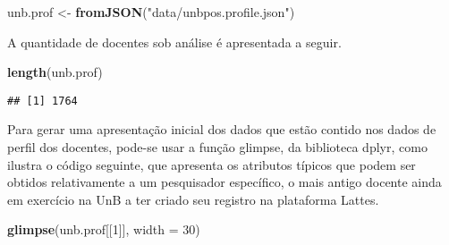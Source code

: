 \documentclass[]{article}
\newenvironment{Shaded}{\begin{snugshade}}{\end{snugshade}}
\newcommand{\KeywordTok}[1]{\textcolor[rgb]{0.13,0.29,0.53}{\textbf{#1}}}
\newcommand{\DataTypeTok}[1]{\textcolor[rgb]{0.13,0.29,0.53}{#1}}
\newcommand{\DecValTok}[1]{\textcolor[rgb]{0.00,0.00,0.81}{#1}}
\newcommand{\StringTok}[1]{\textcolor[rgb]{0.31,0.60,0.02}{#1}}
\newcommand{\NormalTok}[1]{#1}
\begin{document}
\begin{Shaded}
\begin{Highlighting}[]
\NormalTok{unb.prof <-}\StringTok{ }\KeywordTok{fromJSON}\NormalTok{(}\StringTok{"data/unbpos.profile.json"}\NormalTok{)}
\end{Highlighting}
\end{Shaded}

A quantidade de docentes sob análise é apresentada a seguir.

\begin{Shaded}
\begin{Highlighting}[]
\KeywordTok{length}\NormalTok{(unb.prof)}
\end{Highlighting}
\end{Shaded}

\begin{verbatim}
## [1] 1764
\end{verbatim}

Para gerar uma apresentação inicial dos dados que estão contido nos
dados de perfil dos docentes, pode-se usar a função glimpse, da
biblioteca dplyr, como ilustra o código seguinte, que apresenta os
atributos típicos que podem ser obtidos relativamente a um pesquisador
específico, o mais antigo docente ainda em exercício na UnB a ter criado
seu registro na plataforma Lattes.

\begin{Shaded}
\begin{Highlighting}[]
\KeywordTok{glimpse}\NormalTok{(unb.prof[[}\DecValTok{1}\NormalTok{]], }\DataTypeTok{width =} \DecValTok{30}\NormalTok{)}
\end{Highlighting}
\end{Shaded}
\end{document}
